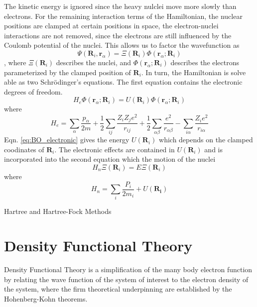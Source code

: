 The kinetic energy is ignored since the heavy nulclei move more slowly than electrons.  For the remaining interaction terms of the Hamiltonian, the nuclear positions are clamped at certain positions in space, the electron-nuclei interactions are not removed, since the electrons are still influenced by the Coulomb potential of the nuclei.  This allows us to factor the wavefunction as
\begin{equation}
	\Psi(\bm{R}_i,\bm{r}_\alpha) = \Xi(\bm{R}_i)\Phi(\bm{r}_\alpha;\bm{R}_i)
\end{equation},
where $\Xi(\bm{R}_i)$ describes the nuclei, and $\Phi(\bm{r}_\alpha;\bm{R}_i)$ describes the electrons parameterized by the clamped position of $\bm{R}_i$.  In turn, the Hamiltonian is solve able as two Schr\"{o}dinger's equations.  The first equation contains the electronic degrees of freedom.
\begin{equation}
\label{eq:BO_electronic}
     H_{e}\Phi(\bm{r}_\alpha;\bm{R}_i)=U(\bm{R}_i)\Phi(\bm{r}_\alpha;\bm{R}_i)
\end{equation}
where
\begin{equation}
	H_e = \sum_\alpha \frac{p_\alpha}{2m}
	      + \frac{1}{2} \sum_{ij} \frac{Z_i Z_j e^2}{r_{ij}}
	      + \frac{1}{2} \sum_{\alpha\beta} \frac{e^2}{r_{\alpha\beta}}
	      - \sum_{i\alpha} \frac{Z_i e^2}{r_{i\alpha}}
\end{equation}
Eqn. \ref{eq:BO_electronic} gives the energy $U(\bm{R}_i)$ which depends on the clamped coodinates of $\bm{R}_i$.  The electronic effects are contained in $U(\bm{R}_i)$ and is incorporated into the second equation which the motion of the nuclei
\begin{equation}
\label{eq:BO_nuclei}
    H_n\Xi(\bm{R}_i)=E\Xi(\bm{R}_i)
\end{equation}
where
\begin{equation}
\label{eq:H_n}
    H_n = \sum_i \frac{P_i}{2m_i} + U(\bm{R_i})
\end{equation}

Hartree and Hartree-Fock Methods
\section{Density Functional Theory}

Density Functional Theory is a simplification of the many body electron function by relating the wave function of the system of interest to the electron density of the system, where the firm theoretical underpinning are established by the Hohenberg-Kohn theorems\cite{hohenberg1964_dft}.

